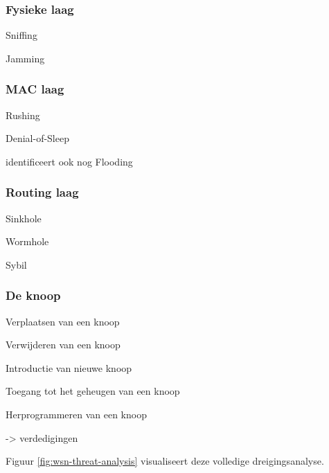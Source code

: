 \subsubsection*{Fysieke laag}

Sniffing

Jamming

\subsubsection*{MAC laag}

Rushing

Denial-of-Sleep

\TODO \cite{dargie2010fundamentals} identificeert ook nog Flooding 

\subsubsection*{Routing laag}

Sinkhole

Wormhole

Sybil

\subsubsection*{De knoop}

Verplaatsen van een knoop

Verwijderen van een knoop

Introductie van nieuwe knoop

Toegang tot het geheugen van een knoop

Herprogrammeren van een knoop

\TODO -> verdedigingen

Figuur \ref{fig:wsn-threat-analysis} visualiseert deze volledige
dreigingsanalyse.

